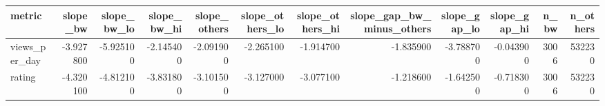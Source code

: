 \begin{tabular}{lrrrrrrrrrrr}
\toprule
metric & slope_bw & slope_bw_lo & slope_bw_hi & slope_others & slope_others_lo & slope_others_hi & slope_gap_bw_minus_others & slope_gap_lo & slope_gap_hi & n_bw & n_others \\
\midrule
views_per_day & -3.927800 & -5.925100 & -2.145400 & -2.091900 & -2.265100 & -1.914700 & -1.835900 & -3.788700 & -0.043900 & 3006 & 532230 \\
rating & -4.320100 & -4.812100 & -3.831800 & -3.101500 & -3.127000 & -3.077100 & -1.218600 & -1.642500 & -0.718300 & 3006 & 532230 \\
\bottomrule
\end{tabular}
